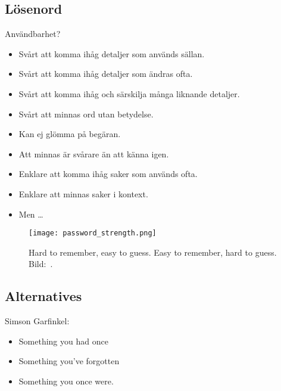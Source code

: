 \subsection{Lösenord}

\begin{frame}{Användbarhet?}
  \begin{itemize}
    \item Svårt att komma ihåg detaljer som används sällan.
    \item Svårt att komma ihåg detaljer som ändras ofta.
    \item Svårt att komma ihåg och särskilja många liknande detaljer.
    \item Svårt att minnas ord utan betydelse.
    \item Kan ej glömma på begäran.
    \item Att minnas är svårare än att känna igen.
  \end{itemize}
\end{frame}

\begin{frame}
  \begin{itemize}
    \item Enklare att komma ihåg saker som används ofta.
    \item Enklare att minnas saker i kontext.
    \item Men \dots
  \end{itemize}
\end{frame}

\begin{frame}
  \begin{figure}
    \texttt{[image: password\_strength.png]}
    \caption{%
      Hard to remember, easy to guess.
      Easy to remember, hard to guess.
      Bild:~\cite{xkcd936}.
    }
  \end{figure}
\end{frame}

\subsection{Alternatives}

\begin{frame}
  \begin{block}{Simson Garfinkel:}
    \begin{itemize}
      \item Something you had once
      \item Something you've forgotten
      \item Something you once were.
    \end{itemize}
  \end{block}
\end{frame}

